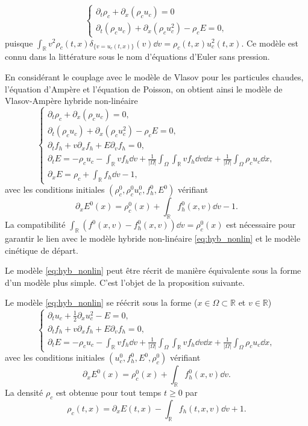 $$
  \begin{cases}
    \partial_t \rho_c + \partial_x (\rho_cu_c) = 0 \\
    \partial_t (\rho_cu_c) + \partial_x (\rho_cu_c^2) - \rho_cE = 0,
  \end{cases}
$$
puisque $\int_{\mathbb{R}} v^2 \rho_c(t,x)\delta_{\{v=u_c(t,x)\}}(v)  \dd{v} = \rho_c(t,x) u_c^2 (t,x)$. Ce modèle est connu dans la littérature sous le nom d'équations d'Euler sans pression.

En considérant le couplage avec le modèle de Vlasov pour les particules chaudes, l'équation d'Ampère et l'équation de Poisson, on obtient ainsi le modèle de Vlasov-Ampère hybride non-linéaire
\begin{equation}
  \begin{cases}
    \partial_t \rho_c + \partial_x (\rho_cu_c) = 0, \\
    \partial_t (\rho_cu_c) + \partial_x (\rho_cu_c^2) - \rho_cE = 0, \\
    \partial_t f_h + v\partial_x f_h + E\partial_v f_h = 0, \\
    \partial_t E = -\rho_cu_c -\int_{\mathbb{R}} vf_h \dd{v}+ \frac{1}{|\Omega|}\int_\Omega \int_{\mathbb{R}} vf_h \dd{v}\dd{x} + \frac{1}{|\Omega|}\int_\Omega \rho_cu_c \dd{x}, \\
    \partial_x E = \rho_c + \int_{\mathbb{R}} f_h \dd{v} - 1, 
  \end{cases}
\label{eq:hyb_nonlin}
\end{equation}
avec les conditions initiales $(\rho^0_{c}, \rho^0_{c} u^0_{c}, f^0_{h}, E^0)$ vérifiant
$$
  \partial_x E^0(x) = \rho^0_{c}(x)+\int_{\mathbb{R}} f^0_{h}(x, v) \dd{v}-1.
$$ 
La compatibilité $\int_{\mathbb{R}} (f^0(x, v) - f^0_h(x, v)) \dd{v}  = \rho^0_{c}(x)$ est nécessaire pour garantir le lien avec le modèle hybride non-linéaire \eqref{eq:hyb_nonlin} et le modèle cinétique de départ. 

Le modèle \eqref{eq:hyb_nonlin} peut être récrit de manière équivalente sous la forme d'un modèle plus simple. C'est l'objet de la proposition suivante.  
\begin{pro}
  Le modèle \eqref{eq:hyb_nonlin} se réécrit sous la forme ($x\in\Omega\subset \mathbb{R}$ et $v\in\mathbb{R}$)
  $$
    \begin{cases}
      \partial_t u_c + \frac{1}{2}\partial_x u_c^2 - E = 0, \\
      \partial_t f_h + v\partial_x f_h + E\partial_v f_h = 0, \\
      \partial_t E = -\rho_c u_c -\int_{\mathbb{R}} vf_h \dd{v}+ \frac{1}{|\Omega|}\int_\Omega \int_{\mathbb{R}} vf_h \dd{v}  \dd{x}+ \frac{1}{|\Omega|}\int_\Omega \rho_cu_c  \dd{x},
      \label{eq:hyb_nonlin_red}
    \end{cases}
  $$
  avec les conditions initiales $(u^0_{c}, f^0_{h}, E^0, \rho_c^0)$ vérifiant
  $$
    \partial_x E^0(x) = \rho^0_{c}(x)+\int_{\mathbb{R}} f^0_{h}(x, v) \dd{v}.
  $$
  La densité $\rho_c$ est obtenue pour tout temps $t\geq 0$ par  
  $$
    \rho_c(t, x) = \partial_x E(t, x) - \int_{\mathbb{R}} f_{h}(t, x, v) \dd{v} + 1. 
  $$
\end{pro}


